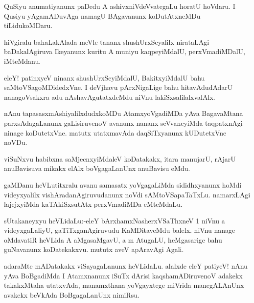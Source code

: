 \documentclass{article}
\begin{document}
\begin{mn}%
QuSiyu anumatiyanunx paDedu A ashivxniVdeVvategaLu horatU hoVdaru. I Qusiyu yAgamADuvAga 
namagU BAgavanunx koDutAtxneMDu tiLidukoMDaru.
\end{mn}

\begin{mn}%
hiVgiralu bahaLakAlada meVle tananx shushUrxSeyalilx nirataLAgi baDakalAgiruva Ikeyanunx 
kuritu A muniyu kaqpeyiMdalU, perxVmadiMDalU, iMteMdanu.
\end{mn}

\begin{mn}%
eleY! patinxyeV ninanx shushUrxSeyiMdalU, BakitxyiMdalU bahu saMtoVSagoMDidedxVne. I 
deVjhavu pArxNigaLige bahu hitavAdudAdarU nanagoVsakxra adu nAshavAgutatxdeMdu niVnu 
lakiSxsalilalxvalAlx.
\end{mn}

\begin{mn}%
nAnu tapasasxmAshiyalilxdudxkoMDu AtamxyoVgadiMDa yAva BagavaMtana parxsAdagaLanunx 
gaLisiruvenoV avanunx nananx seVvaneyiMda taqpatxnAgi ninage koDutetxVne. matutx 
utatxmavAda daqSiTxyanunx kUDutetxVne noVDu.
\end{mn}

\begin{mn}%
viSuNxvu habibxna saMjecnxyiMdaleV koDatakakx, itara manujarU, rAjarU anuBavisuva mikakx 
elAlx boVgagaLanUnx anuBavisu eMdu.
\end{mn}

\begin{mn}%
gaMDanu heVLutitxralu avanu samasatx yoVgagaLiMda sididhxyanunx hoMdi videyxyalilx 
vishAradanAgiruvudanunx noVdi sAMtoVSapaTaTxLu. namarxLAgi lajejxyiMda kaTAkiSxsutAtx 
perxVmadiMDa eMteMdaLu.
\end{mn}

\begin{mn}%
sUtakaneyxyu heVLidaLu:-eleY bArxhamxNasherxVSaThxneV 1 niVnu a videyxgaLaliyU, 
gaTiTxganAgiruvudu KaMDitaveMdu balelx. niVnu nanage oMdavatiR heVLida A aMgasaMgavU, a m 
AtugaLU, heMgasarige bahu guNavanunx koDatekakxvu. mututx aveV apAravAgi Agali.
\end{mn}

\begin{mn}%
adaraMte mADatakakx viSayagaLanunx heVLidaLu. alalxde eleY patiyeV! nAnu yAva BoBgadiMda I
Atamxnanunx iSuTx dArisi kaqshamADiruvenoV adakekx takakxMtaha utatxvAda, manamxthana 
yoVgayxtege miVrida manegALAnUnx avakekx beVkAda BoBgagaLanUnx nimiRsu.
\end{mn}
\end{document}
